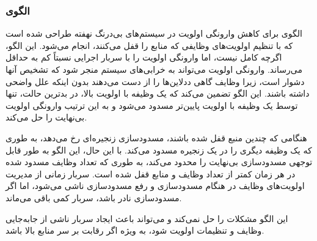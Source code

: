 \subsubsection{الگوی }
\label{resourcePriorInheritSec}
\begin{RTL}
الگوی  \cite{ref4}
برای کاهش وارونگی اولویت
در سیستم‌های بی‌درنگ نهفته طراحی شده است که با تنظیم اولویت‌های
وظایفی که منابع را قفل می‌کنند، انجام می‌شود.
این الگو، اگرچه کامل نیست، اما وارونگی اولویت را با سربار اجرایی
نسبتاً کم به حداقل می‌رساند. وارونگی اولویت می‌تواند به خرابی‌های
سیستم منجر شود که تشخیص آنها دشوار است، زیرا وظایف گاهی
ددلاین‌ها را از دست می‌دهند بدون اینکه علل واضحی داشته باشند.
این الگو تضمین می‌کند که یک وظیفه با اولویت بالا، در بدترین حالت،
تنها توسط یک وظیفه با اولویت پایین‌تر مسدود می‌شود و
به این ترتیب وارونگی اولویت بی‌نهایت را حل می‌کند.
\end{RTL}
\begin{RTL}
هنگامی که چندین منبع قفل شده باشند، مسدودسازی زنجیره‌ای
رخ می‌دهد، به طوری که یک وظیفه دیگری را در یک زنجیره
مسدود می‌کند. با این حال، این الگو به طور قابل توجهی مسدودسازی بی‌نهایت
را محدود می‌کند، به طوری که تعداد وظایف مسدود شده در
هر زمان کمتر از تعداد وظایف و منابع قفل شده است.
سربار زمانی از مدیریت اولویت‌های وظایف در هنگام مسدودسازی
و رفع مسدودسازی ناشی می‌شود، اما اگر مسدودسازی نادر باشد،
سربار کمی باقی می‌ماند.
\end{RTL}
\begin{RTL}
این الگو مشکلات  را حل نمی‌کند و می‌تواند باعث ایجاد سربار ناشی
از جابه‌جایی وظایف و تنظیمات اولویت شود، به ویژه اگر رقابت بر سر منابع بالا باشد.
\end{RTL}
